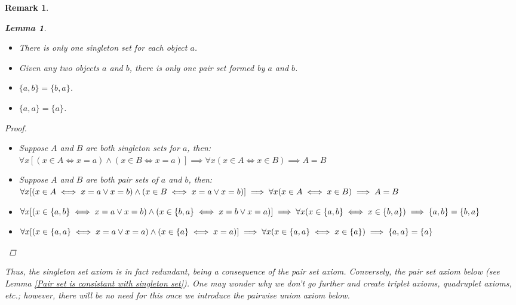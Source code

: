 \documentclass[a4paper,oneside]{book}
\newtheorem*{proof}{\textit{Proof.}}
\newtheorem{lemma}{Lemma}[section]
\newtheorem{remark}{Remark}[section]
\begin{document}
			\begin{remark}
				\begin{lemma}~
					\begin{itemize}
						\item There is only one singleton set for each object $a$.
						\item Given any two objects $a$ and $b$, there is only one pair set formed by $a$ and $b$.
						\item $\{a,b\}=\{b,a\}$.
						\item $\{a,a\}=\{a\}$.
					\end{itemize}
				\end{lemma}
				\begin{proof}~
					\begin{itemize}
						\item Suppose $A$ and $B$ are both singleton sets for $a$, then:\\
						$\forall x[(x\in A\iff x=a)\land(x\in B\iff x=a)]\implies\forall x(x\in A\iff x\in B)\implies A=B$
						\item Suppose $A$ and $B$ are both pair sets of $a$ and $b$, then:\\
						$\forall x[(x\in A\iff x=a\lor x=b)\land(x\in B\iff x=a\lor x=b)]\implies\forall x(x\in A\iff x\in B)\\\implies A=B$
						\item $\forall x[(x\in \{a,b\}\iff x=a\lor x=b)\land(x\in \{b,a\}\iff x=b\lor x=a)]\\\implies\forall x(x\in \{a,b\}\iff x\in \{b,a\})\implies\{a,b\}=\{b,a\}$
						\item $\forall x[(x\in \{a,a\}\iff x=a\lor x=a)\land(x\in \{a\}\iff x=a)]\\\implies\forall x(x\in\{a,a\}\iff x\in \{a\})\implies\{a,a\}=\{a\}$
					\end{itemize}
				\end{proof}
				Thus, the singleton set axiom is in fact redundant, being a consequence of the pair set axiom. Conversely, the pair set axiom below (see Lemma \ref{Pair set is consistant with singleton set}). One may wonder why we don't go further and create triplet axioms, quadruplet axioms, etc.; however, there will be no need for this once we introduce the pairwise union axiom below.
			\end{remark}
\end{document}
